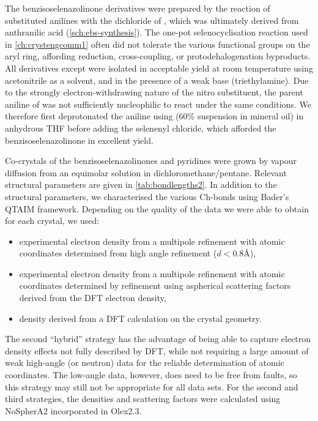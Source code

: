 \begin{refsection}
The benzisoselenazolinone derivatives  were prepared by the reaction of substituted anilines with the dichloride of , which was ultimately derived from anthranilic acid (\cref{sch:ebs-synthesis}).
The one-pot selenocyclisation reaction used in \cref{ch:crystengcomm1} often did not tolerate the various functional groups on the aryl ring, affording reduction, cross-coupling, or protodehalogenation byproducts.
All derivatives except  were isolated in acceptable yield at room temperature using acetonitrile as a solvent, and in the presence of a weak base (triethylamine).
Due to the strongly electron-withdrawing nature of the nitro substituent, the parent aniline of  was not sufficiently nucleophilic to react under the same conditions.
We therefore first deprotonated the aniline using  (60\% suspension in mineral oil) in anhydrous THF before adding the selenenyl chloride, which afforded the benzisoselenazolinone in excellent yield.

Co-crystals of the benzisoselenazolinones and pyridines were grown by vapour diffusion from an equimolar solution in dichloromethane/pentane.
Relevant structural parameters are given in \cref{tab:bondlengths2}.
In addition to the structural parameters, we characterised the various Ch-bonds using Bader's QTAIM framework.
Depending on the quality of the data we were able to obtain for each crystal, we used:

\begin{itemize}
    \item experimental electron density from a multipole refinement with atomic coordinates determined from high angle refinement ($d < 0.8$\AA),
    \item experimental electron density from a multipole refinement with atomic coordinates determined by refinement using aspherical scattering factors derived from the DFT electron density,
    \item density derived from a DFT calculation on the crystal geometry.
\end{itemize}

The second ``hybrid'' strategy has the advantage of being able to capture electron density effects not fully described by DFT, while not requiring a large amount of weak high-angle (or neutron) data for the reliable determination of atomic coordinates.
The low-angle data, however, does need to be free from faults, so this strategy may still not be appropriate for all data sets.
For the second and third strategies, the densities and scattering factors were calculated using NoSpherA2 incorporated in Olex2.3.\autocite{Kleemiss2021}


\end{refsection}
